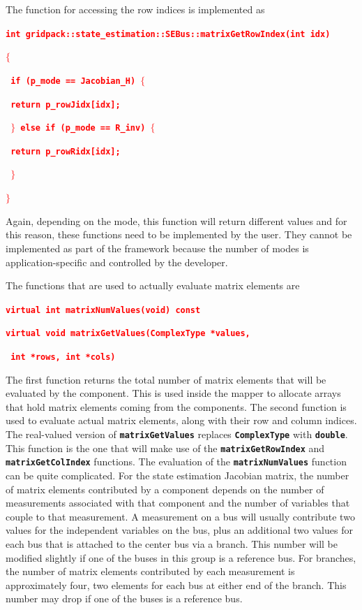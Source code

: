 \documentclass[12pt]{report} %
\begin{document}
The function for accessing the row indices is implemented as

\textcolor{red}{\texttt{\textbf{int gridpack::state\_estimation::SEBus::matrixGetRowIndex(int idx)}}}

\textcolor{red}{\texttt{\textbf{$\boldsymbol{\mathrm{\{}}$}}}

\textcolor{red}{\texttt{\textbf{  if (p\_mode == Jacobian\_H) $\boldsymbol{\mathrm{\{}}$}}}

\textcolor{red}{\texttt{\textbf{    return p\_rowJidx[idx];}}}

\textcolor{red}{\texttt{\textbf{  $\boldsymbol{\mathrm{\}}}$ else if (p\_mode == R\_inv) $\boldsymbol{\mathrm{\{}}$}}}

\textcolor{red}{\texttt{\textbf{    return p\_rowRidx[idx];}}}

\textcolor{red}{\texttt{\textbf{  $\boldsymbol{\mathrm{\}}}$}}}

\textcolor{red}{\texttt{\textbf{$\boldsymbol{\mathrm{\}}}$}}}

Again, depending on the mode, this function will return different values and for this reason, these functions need to be implemented by the user. They cannot be implemented as part of the framework because the number of modes is application-specific and controlled by the developer.

The functions that are used to actually evaluate matrix elements are

\textcolor{red}{\texttt{\textbf{virtual int matrixNumValues(void) const}}}

\textcolor{red}{\texttt{\textbf{virtual void matrixGetValues(ComplexType *values,}}}

\textcolor{red}{\texttt{\textbf{                             int *rows, int *cols)}}}

The first function returns the total number of matrix elements that will be evaluated by the component. This is used inside the mapper to allocate arrays that hold matrix elements coming from the components. The second function is used to evaluate actual matrix elements, along with their row and column indices. The real-valued version of \texttt{\textbf{matrixGetValues}} replaces \texttt{\textbf{ComplexType}} with \texttt{\textbf{double}}. This function is the one that will make use of the \texttt{\textbf{matrixGetRowIndex}} and \texttt{\textbf{matrixGetColIndex}} functions. The evaluation of the \texttt{\textbf{matrixNumValues}} function can be quite complicated. For the state estimation Jacobian matrix, the number of matrix elements contributed by a component depends on the number of measurements associated with that component and the number of variables that couple to that measurement. A measurement on a bus will usually contribute two values for the independent variables on the bus, plus an additional two values for each bus that is attached to the center bus via a branch. This number will be modified slightly if one of the buses in this group is a reference bus. For branches, the number of matrix elements contributed by each measurement is approximately four, two elements for each bus at either end of the branch. This number may drop if one of the buses is a reference bus.
\end{document}
